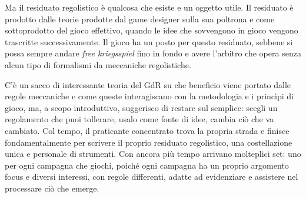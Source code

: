Ma il residuato regolistico è qualcosa che esiste e un oggetto utile. Il residuato è prodotto dalle teorie prodotte dal game designer sulla sua poltrona e come sottoprodotto del gioco effettivo, quando le idee che sovvengono in gioco vengono trascritte successivamente. Il gioco ha un posto per questo residuato, sebbene si possa sempre andare \textit{free kriegsspiel} fino in fondo e avere l'arbitro che opera senza alcun tipo di formalismi da meccaniche regolistiche.

C'è un sacco di interessante teoria del GdR su che beneficio viene portato dalle regole meccaniche e come queste interagiscano con la metodologia e i princìpi di gioco, ma, a scopo introduttivo, suggerisco di restare sul semplice: scegli un regolamento che puoi tollerare, usalo come fonte di idee, cambia ciò che va cambiato. Col tempo, il praticante concentrato trova la propria strada e finisce fondamentalmente per scrivere il proprio residuato regolistico, una costellazione unica e personale di strumenti. Con ancora più tempo arrivano molteplici set: uno per ogni campagna che giochi, poiché ogni campagna ha un proprio argomento focus e diversi interessi, con regole differenti, adatte ad evidenziare e assistere nel processare ciò che emerge.